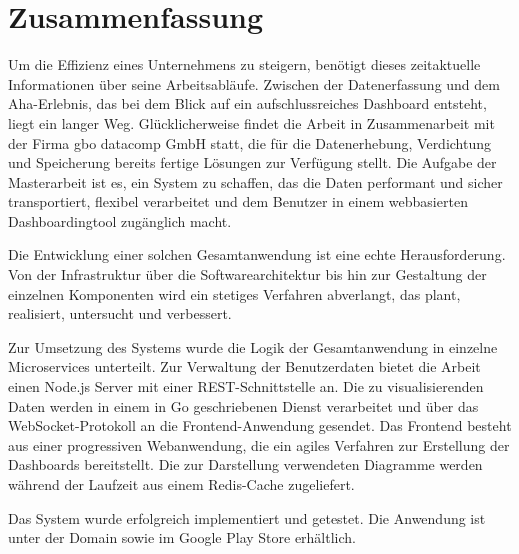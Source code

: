 \chapter*{Zusammenfassung}
\label{chap:zusammenfassung}

Um die Effizienz eines Unternehmens zu steigern, benötigt dieses zeitaktuelle Informationen über seine Arbeitsabläufe.
Zwischen der Datenerfassung und dem Aha-Erlebnis, das bei dem Blick auf ein aufschlussreiches Dashboard entsteht, liegt ein
langer Weg. Glücklicherweise findet die Arbeit in Zusammenarbeit mit der Firma gbo datacomp GmbH statt, die für die
Datenerhebung, Verdichtung und Speicherung bereits fertige Lösungen zur Verfügung stellt. Die Aufgabe der Masterarbeit
ist es, ein System zu schaffen, das die Daten performant und sicher transportiert, flexibel verarbeitet und dem Benutzer
in einem webbasierten Dashboardingtool zugänglich macht.

Die Entwicklung einer solchen Gesamtanwendung ist eine echte Herausforderung. Von der Infrastruktur
über die Softwarearchitektur bis hin zur Gestaltung der einzelnen Komponenten wird ein stetiges
Verfahren abverlangt, das plant, realisiert, untersucht und verbessert.

Zur Umsetzung des Systems wurde die Logik der Gesamtanwendung in einzelne Microservices
unterteilt. Zur Verwaltung der Benutzerdaten bietet die Arbeit einen Node.js Server
mit einer REST-Schnittstelle an. Die zu visualisierenden Daten werden in einem
in Go geschriebenen Dienst verarbeitet und über das WebSocket-Protokoll an die
Frontend-Anwendung gesendet. Das \mbox{Frontend} besteht aus einer progressiven Webanwendung,
die ein agiles Verfahren zur Erstellung der Dashboards bereitstellt. Die zur Darstellung
verwendeten Diagramme werden während der Laufzeit aus einem Redis-Cache zugeliefert.

Das System wurde erfolgreich implementiert und getestet. Die Anwendung ist unter der Domain 
sowie im Google Play Store erhältlich.
